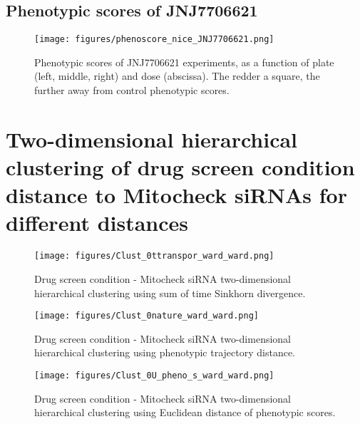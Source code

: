 \subsection{Phenotypic scores of JNJ7706621}
\label{sec:jnj}
\begin{figure*}[ht!]
\centerline{
\texttt{[image: figures/phenoscore\_nice\_JNJ7706621.png]}}
\caption{Phenotypic scores of JNJ7706621 experiments, as a function of plate (left, middle, right) and dose (abscissa). The redder a square, the further away from control phenotypic scores.}
\label{jnj}
\end{figure*}



\clearpage
\section{Two-dimensional hierarchical clustering of drug screen condition distance to Mitocheck siRNAs for different distances}
\label{appendix:heatmaps}

\begin{figure*}[ht!]
\centerline{\texttt{[image: figures/Clust\_0ttranspor\_ward\_ward.png]}
}
\caption{Drug screen condition - Mitocheck siRNA two-dimensional hierarchical clustering using sum of time Sinkhorn divergence.}
\label{cond_clust_ttransport}
\end{figure*}

\begin{figure*}[ht!]
\centerline{\texttt{[image: figures/Clust\_0nature\_ward\_ward.png]}
}
\caption{Drug screen condition - Mitocheck siRNA two-dimensional hierarchical clustering using phenotypic trajectory distance.}
\label{cond_clust_nature}
\end{figure*}

\begin{figure*}[ht!]
\centerline{\texttt{[image: figures/Clust\_0U\_pheno\_s\_ward\_ward.png]}
}
\caption{Drug screen condition - Mitocheck siRNA two-dimensional hierarchical clustering using Euclidean distance of phenotypic scores.}
\label{cond_clust_ps}
\end{figure*}



\clearpage
